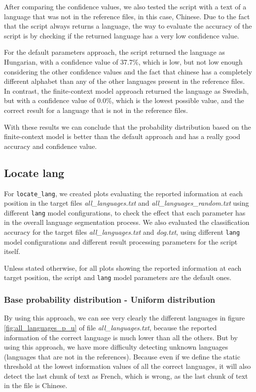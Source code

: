 \documentclass{article}
\begin{document}
After comparing the confidence values, we also tested the script with a text of a language that was not in the reference files, in this case, Chinese.
Due to the fact that the script always returns a language, the way to evaluate the accuracy of the script is by checking if the returned language has a very low confidence value.

For the default parameters approach, the script returned the language as Hungarian, with a confidence value of 37.7\%, which is low, but not low enough considering the other confidence values and
the fact that chinese has a completely different alphabet than any of the other languages present in the reference files.
In contrast, the finite-context model approach returned the language as Swedish, but with a confidence value of 0.0\%, which is the lowest possible value, and the correct result
for a language that is not in the reference files.

With these results we can conclude that the probability distribution based on the finite-context model is better than the default approach and has a really good accuracy and confidence value.

\subsection{Locate lang}
\label{subsec:results_locate_lang}

For \texttt{locate\_lang}, we created plots evaluating the reported information at each position in the target files \textit{all\_languages.txt} and \textit{all\_languages\_random.txt} using different \texttt{lang} model configurations, to check the effect that each parameter has in the overall language segmentation process.
We also evaluated the classification accuracy for the target files \textit{all\_languages.txt} and \textit{dog.txt}, using different \texttt{lang} model configurations and different result processing parameters for the script itself.

Unless stated otherwise, for all plots showing the reported information at each target position, the script and \texttt{lang} model parameters are the default ones.

\subsubsection{Base probability distribution - Uniform distribution}
\label{subsubsec:results_locate_lang_uniform_distribution}

By using this approach, we can see very clearly the different languages in figure \ref{fig:all_languages_p_u} of file \textit{all\_languages.txt},
because the reported information of the correct language is much lower than all the others.
But by using this approach, we have more difficulty detecting unknown languages (languages that are not in the references).
Because even if we define the static threshold at the lowest information values of all the correct languages,
it will also detect the last chunk of text as French, which is wrong, as the last chunk of text in the file is Chinese.
\end{document}
